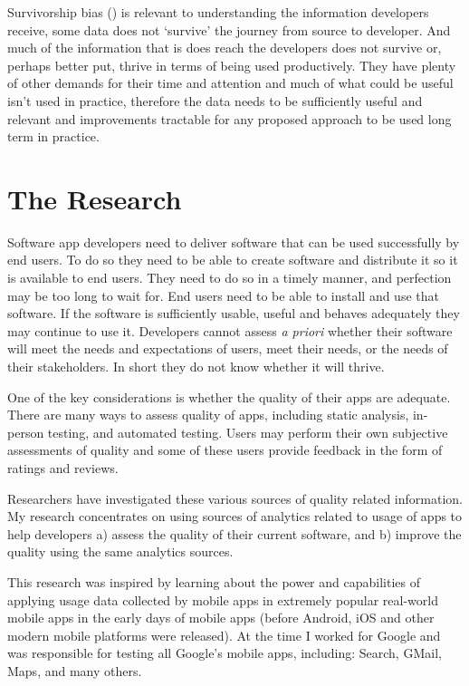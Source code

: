 Survivorship bias (\cite{wikipedia_survivorship_bias}) is relevant to understanding the information developers receive, some data does not `survive' the journey from source to developer. And much of the information that is does reach the developers does not survive or, perhaps better put, thrive in terms of being used productively. They have plenty of other demands for their time and attention and much of what could be useful isn't used in practice, therefore the data needs to be sufficiently useful and relevant and improvements tractable for any proposed approach to be used long term in practice.



\section{The Research}
Software app developers need to deliver software that can be used successfully by end users. To do so they need to be able to create software and distribute it so it is available to end users. They need to do so in a timely manner, and perfection may be too long to wait for. End users need to be able to install and use that software. If the software is sufficiently usable, useful and behaves adequately they may continue to use it. Developers cannot assess \emph{a priori} whether their software will meet the needs and expectations of users, meet their needs, or the needs of their stakeholders. In short they do not know whether it will thrive.

One of the key considerations is whether the quality of their apps are adequate. There are many ways to assess quality of apps, including static analysis, in-person testing, and automated testing. Users may perform their own subjective assessments of quality and some of these users provide feedback in the form of ratings and reviews. 

Researchers have investigated these various sources of quality related information. My research concentrates on using sources of analytics related to usage of apps to help developers a) assess the quality of their current software, and b) improve the quality using the same analytics sources.

This research was inspired by learning about the power and capabilities of applying usage data collected by mobile apps in extremely popular real-world mobile apps in the early days of mobile apps (before Android, iOS and other modern mobile platforms were released). At the time I worked for Google and was responsible for testing all Google's mobile apps, including: Search, GMail, Maps, and many others.

